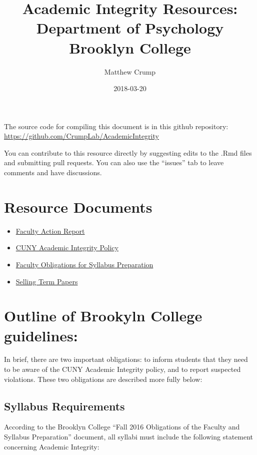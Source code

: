 \documentclass[]{book}
\title{Academic Integrity Resources: Department of Psychology Brooklyn College}
\author{Matthew Crump}
\date{2018-03-20}
\providecommand{\tightlist}{%
  \setlength{\itemsep}{0pt}\setlength{\parskip}{0pt}}
\theoremstyle{definition}
\theoremstyle{definition}
\theoremstyle{definition}
\theoremstyle{remark}
\begin{document}
\maketitle

{
\setcounter{tocdepth}{1}
\tableofcontents
}
The source code for compiling this document is in this github
repository: \url{https://github.com/CrumpLab/AcademicIntegrity}

You can contribute to this resource directly by suggesting edits to the
.Rmd files and submitting pull requests. You can also use the ``issues''
tab to leave comments and have discussions.

\chapter*{Resource Documents}\label{resource-documents}

\begin{itemize}
\tightlist
\item
  \href{\%22Resources/Faculty\%20Action\%20Report.pdf\%22}{Faculty
  Action Report}
\item
  \href{\%22Resources/Academic_Integrity_Policy.pdf\%22}{CUNY Academic
  Integrity Policy}
\item
  \href{\%22Resources/F16_FacultyObligations_andSyllabus.pdf\%22}{Faculty
  Obligations for Syllabus Preparation}
\item
  \href{\%22Resources/110901_TermPapers_Sale.pdf\%22}{Selling Term
  Papers}
\end{itemize}

\chapter{Outline of Brookyln College
guidelines:}\label{outline-of-brookyln-college-guidelines}

In brief, there are two important obligations: to inform students that
they need to be aware of the CUNY Academic Integrity policy, and to
report suspected violations. These two obligations are described more
fully below:

\section{Syllabus Requirements}\label{syllabus-requirements}

According to the Brooklyn College ``Fall 2016 Obligations of the Faculty
and Syllabus Preparation'' document, all syllabi must include the
following statement concerning Academic Integrity:
\end{document}

